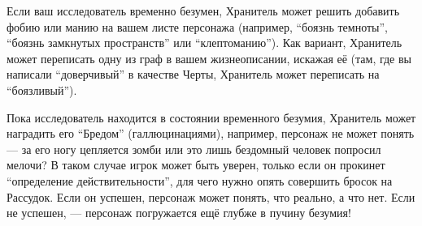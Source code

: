 \documentclass[letterpaper,twocolumn,openany, twoside, 11pt, usenames]{cocbook}
\newlength{\seplinewidth}
\newlength{\seplinesep}
\newcommand*{\sepline}{%
  \par
  \vspace{\dimexpr\seplinesep+.5\parskip}%
  \cleaders\vbox{%
    \begingroup %
      \color{sepline}%
      \hrule width\linewidth height\seplinewidth
    \endgroup
  }\vskip\seplinewidth
  \vspace{\dimexpr\seplinesep-.5\parskip}%
}
\begin{document}
{}{}
Если ваш исследователь временно безумен, Хранитель может решить добавить фобию или манию на вашем листе персонажа (например, ``боязнь темноты'', ``боязнь замкнутых пространств'' или ``клептоманию''). Как вариант, Хранитель может переписать одну из граф в вашем жизнеописании, искажая её (там, где вы написали ``доверчивый'' в качестве Черты, Хранитель может переписать на ``боязливый'').

Пока исследователь находится в состоянии временного безумия, Хранитель может наградить его ``Бредом'' (галлюцинациями), например, персонаж не может понять --- за его ногу цепляется зомби или это лишь бездомный человек попросил мелочи? В таком случае игрок может быть уверен, только если он прокинет ``определение действительности'', для чего нужно опять совершить бросок на Рассудок. Если он успешен, персонаж может понять, что реально, а что нет. Если не успешен, --- персонаж погружается ещё глубже в пучину безумия!
\end{document}
